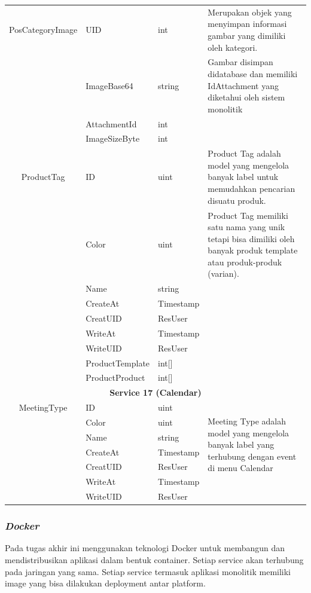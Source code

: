 \begin{longtable}{|c|p{3cm}|p{3cm}|p{4cm}|}
	\hline
	PosCategoryImage & UID & int & Merupakan objek yang menyimpan informasi gambar yang dimiliki oleh kategori. \\
	\cline{2-3}
	& ImageBase64 & string & Gambar disimpan didatabase dan memiliki IdAttachment yang diketahui oleh sistem monolitik\\
	\cline{2-3}
	& AttachmentId & int & \\
	\cline{2-3}
	& ImageSizeByte & int & \\

	\hline
	ProductTag & ID & uint & Product Tag adalah model yang mengelola banyak label untuk memudahkan pencarian disuatu  produk. \\
	\cline{2-3}
	& Color & uint & Product Tag memiliki satu nama yang unik tetapi bisa dimiliki oleh banyak produk template atau produk-produk (varian). \\
	\cline{2-3}
	& Name & string & \\
	\cline{2-3}
	& CreateAt & Timestamp & \\
	\cline{2-3}
	& CreatUID & ResUser & \\
	\cline{2-3}
	& WriteAt & Timestamp & \\
	\cline{2-3}
	& WriteUID & ResUser & \\
	\cline{2-3}
	& ProductTemplate & int[] & \\
	\cline{2-3}
	& ProductProduct & int[] & \\
	\hline

	\multicolumn{4}{|c|}{\textbf{Service 17 (Calendar)}} \\
	\hline
	MeetingType & ID & uint & \multirow{6}{4cm}{Meeting Type adalah model yang mengelola banyak label yang terhubung dengan event di menu Calendar} \\
	\cline{2-3}
	& Color & uint & \\
	\cline{2-3}
	& Name & string & \\
	\cline{2-3}
	& CreateAt & Timestamp & \\
	\cline{2-3}
	& CreatUID & ResUser & \\
	\cline{2-3}
	& WriteAt & Timestamp & \\
	\cline{2-3}
	& WriteUID & ResUser & \\
	\hline
\end{longtable}

\subsubsection{\textit{Docker} }
Pada tugas akhir ini menggunakan teknologi Docker untuk membangun dan mendistribusikan aplikasi dalam bentuk container. Setiap service akan terhubung pada jaringan yang sama. Setiap service termasuk aplikasi monolitik memiliki image yang bisa dilakukan deployment antar platform. 

